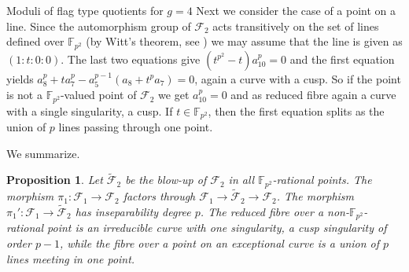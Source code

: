 \documentclass[11pt]{amsart}
\numberwithin{equation}{section}
\newcommand{\FF}{\mathbb F}
\newtheorem{proposition}[theorem]{Proposition}
\newtheorem{corollary}[theorem]{Corollary}
\theoremstyle{definition}
\theoremstyle{remark}
\begin{document}
\begin{section}{Moduli of flag type quotients for $g=4$}
Next we consider the case of a point on a line. Since the automorphism group
of $\mathcal{F}_2$ acts transitively on the set of lines defined over ${\FF}_{p^2}$ 
(by Witt's theorem, see \cite{K2017}) we may assume that the
line is given as $(1:t:0:0)$. The last two equations give
$(t^{p^2}-t)a_{10}^p=0$ and the first equation yields
$a_8^p+ta_7^p-a_5^{p-1}(a_8+t^pa_7)=0$, again a curve with a cusp.
So if the point is not a ${\FF}_{p^2}$-valued point of $\mathcal{F}_2$
we get $a_{10}^p=0$ and
as reduced fibre again a curve with a 
single singularity, a cusp.
If $t\in {\FF}_{p^2}$, then the first equation splits as the union of
$p$ lines passing through one point. 

We summarize.

\begin{proposition} Let $\tilde{\mathcal{F}}_2$ be the blow-up of $\mathcal{F}_2$
in all ${\FF}_{p^2}$-rational points. 
The morphism $\pi_1: \mathcal{F}_1 \to \mathcal{F}_2$ factors through
$ \mathcal{F}_1 \to \tilde{\mathcal{F}}_2 \to \mathcal{F}_2$. The
morphism $\pi_1': \mathcal{F}_1 \to \tilde{\mathcal{F}}_2$ has inseparability 
degree $p$. The reduced fibre over a 
non-${\FF}_{p^2}$-rational point is an irreducible curve with one singularity,
a cusp singularity of order $p-1$, while the fibre over a point on an 
exceptional curve is a union of $p$ lines
meeting in one point.
\end{proposition}
\end{section}
\end{document}
